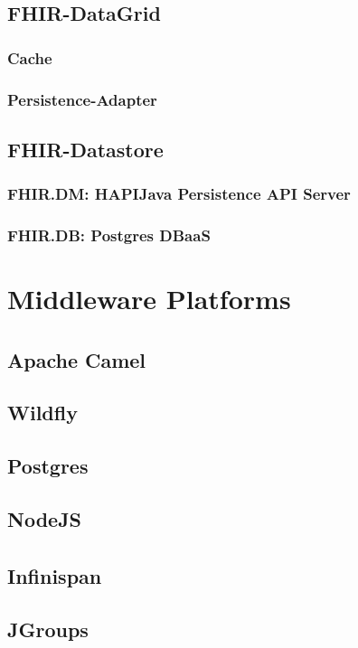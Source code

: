 \documentclass[a4paper]{book}
\begin{document}
\subsection{FHIR-DataGrid}
\subsubsection{Cache}
\subsubsection{Persistence-Adapter}

\subsection{FHIR-Datastore}
\subsubsection{FHIR.DM: HAPI\texttrademark Java Persistence API Server}
\subsubsection{FHIR.DB: Postgres DBaaS}

\section{Middleware Platforms}
\subsection{Apache\textsuperscript{\textregistered} Camel\texttrademark}
\subsection{Wildfly\texttrademark}
\subsection{Postgres}
\subsection{NodeJS}
\subsection{Infinispan\textsuperscript{\textregistered}}
\subsection{JGroups\texttrademark}
\end{document}
